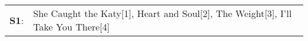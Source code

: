 \begin{supertabular}{p{0.03\textwidth}p{0.92\textwidth}}
 \textbf{S1}:  &  She Caught the Katy[1]\textsuperscript{}, \enspace Heart and Soul[2]\textsuperscript{}, \enspace The Weight[3]\textsuperscript{}, \enspace I'll Take You There[4]\textsuperscript{}  \enspace  \\
\end{supertabular}
